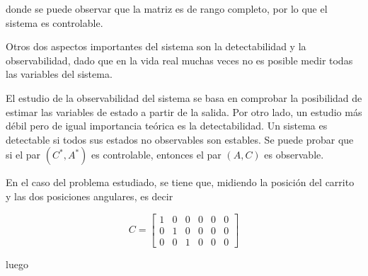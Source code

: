 donde se puede observar que la matriz es de rango completo, por lo que el sistema es controlable.


Otros dos aspectos importantes del sistema son la detectabilidad y la observabilidad, dado que en la vida real muchas veces no es posible medir todas las variables del sistema. 

El estudio de la observabilidad del sistema se basa en comprobar la posibilidad de estimar las variables de estado a partir de la salida. Por otro lado, un estudio más débil pero de igual importancia teórica es la detectabilidad. Un sistema es detectable si todos sus estados no observables son estables. Se puede probar que si el par $(C^*,A^*)$ es controlable, entonces el par $(A,C)$ es observable. 

En el caso del problema estudiado, se tiene que, midiendo la posición del carrito y las dos posiciones angulares, es decir

\begin{equation}
C = 	\begin{bmatrix}
1 & 0 & 0 & 0 & 0 & 0\\
0 & 1 & 0 & 0 & 0 & 0\\
0 & 0 & 1 & 0 & 0 & 0
\end{bmatrix}
\end{equation}

luego

\begin{equation}
[C^* \ A^*C^* \ \cdots \ A^{*n-1}C^*]
\end{equation}

